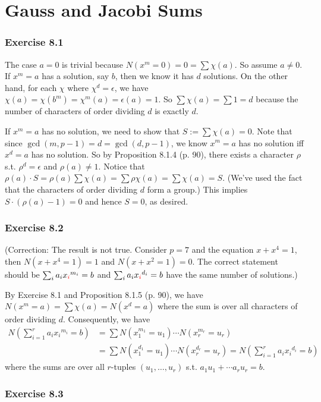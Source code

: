 \documentclass[../I&R.tex]{subfiles}
\begin{document}
\chapter{Gauss and Jacobi Sums}

\subsection*{Exercise 8.1}

The case $a=0$ is trivial because $N(x^m=0)=0=\sum \chi(a)$. So assume $a\neq 0$. If $x^m=a$ has a solution, say $b$, then we know it has $d$ solutions. On the other hand, for each $\chi$ where $\chi^d=\epsilon$, we have $\chi(a)=\chi(b^m)=\chi^m(a)=\epsilon(a)=1$. So $\sum\chi(a)=\sum 1=d$ because the number of characters of order dividing $d$ is exactly $d$.

If $x^m=a$ has no solution, we need to show that $S:=\sum\chi(a)=0$. Note that since $\gcd(m,p-1)=d=\gcd(d,p-1)$, we know $x^m=a$ has no solution iff $x^d=a$ has no solution. So by Proposition 8.1.4 (p. 90), there exists a character $\rho$ s.t. $\rho^d=\epsilon$ and $\rho(a)\neq1$. Notice that $\rho(a)\cdot S=\rho(a)\sum\chi(a)=\sum\rho\chi(a)=\sum\chi(a)=S$. (We've used the fact that the characters of order dividing $d$ form a group.) This implies $S\cdot(\rho(a)-1)=0$ and hence $S=0$, as desired.

\subsection*{Exercise 8.2}

(Correction: The result is not true. Consider $p=7$ and the equation $x+x^4=1$, then $N(x+x^4=1)=1$ and $N(x+x^2=1)=0$. The correct statement should be $\sum_i a_ix_{\color{red}i}^{m_i}=b$ and $\sum_i a_ix_{\color{red}i}^{d_i}=b$ have the same number of solutions.)

By Exercise 8.1 and Proposition 8.1.5 (p. 90), we have $N(x^m=a)=\sum \chi(a)=N(x^d=a)$ where the sum is over all characters of order dividing $d$. Consequently, we have
\begin{align*}
    N\left(\sum_{i=1}^r a_i{x_i}^{m_i}=b\right) &= \sum N(x_1^{m_1}=u_1)\cdots N(x_r^{m_r}=u_r) \\
    &= \sum N(x_1^{d_1}=u_1)\cdots N(x_r^{d_r}=u_r) = N\left(\sum_{i=1}^r a_i{x_i}^{d_i}=b\right)
\end{align*}
where the sums are over all $r$-tuples $(u_1,\ldots,u_r)$ s.t. $a_1u_1+\cdots a_ru_r=b$.

\subsection*{Exercise 8.3}
\end{document}
